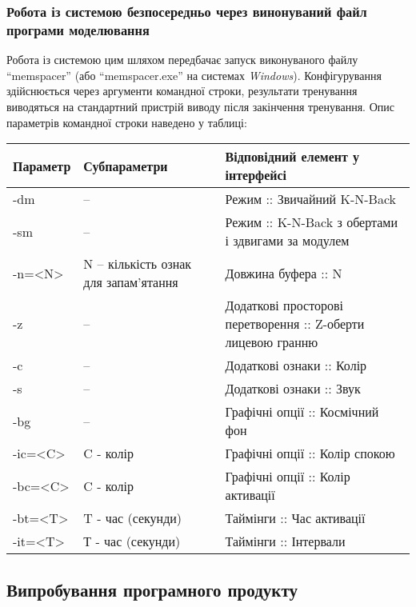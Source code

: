 \subsubsection{Робота із системою безпосередньо через винонуваний файл програми моделювання}
Робота із системою цим шляхом передбачає запуск виконуваного файлу ``memspacer'' (або ``memspacer.exe'' на системах \emph{Windows}). Конфігурування здійснюється через аргументи командної строки, результати тренування виводяться на стандартний пристрій виводу після закінчення тренування.
\newpage
Опис параметрів командної строки наведено у таблиці:
\small\begin{longtable}{| C{4cm} | C{5cm} | C{6cm} |}
  \hline
  Параметр & Субпараметри & Відповідний елемент у інтерфейсі \\
  \hline
  -dm
  & --
  & Режим :: Звичайний K-N-Back \\
  \hline
  -sm
  & --
  & Режим :: K-N-Back з обертами і здвигами за модулем \\
  \hline
  -n=<N>
  & N -- кількість ознак для запам'ятання
  & Довжина буфера :: N \\
  \hline
  -z
  & --
  & Додаткові просторові перетворення :: Z-оберти лицевою гранню \\
  \hline
  -c
  & --
  & Додаткові ознаки :: Колір \\
  \hline
  -s
  & --
  & Додаткові ознаки :: Звук \\
  \hline
  -bg
  & --
  & Графічні опції :: Космічний фон \\
  \hline
  -ic=<C>
  & C - колір
  & Графічні опції :: Колір спокою \\
  \hline
  -bc=<C>
  & C - колір
  & Графічні опції :: Колір активації \\
  \hline
  -bt=<T>
  & T - час (секунди)
  & Таймінги :: Час активації \\
  \hline
  -it=<T>
  & Т - час (секунди)
  & Таймінги :: Інтервали \\
  \hline
\end{longtable}\normalsize
\newpage
\subsection{Випробування програмного продукту}